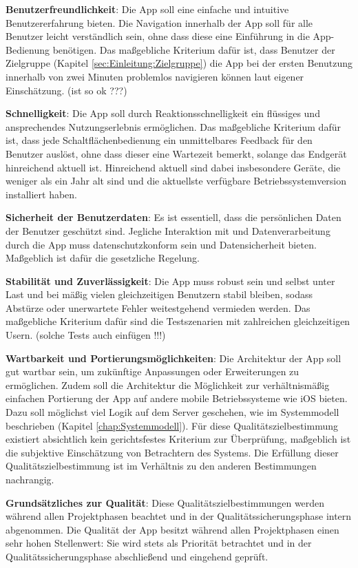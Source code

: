 \documentclass[oneside, ngerman]{sdqtechreport}
\begin{document}
\textbf{Benutzerfreundlichkeit}: Die App soll eine einfache und intuitive Benutzererfahrung bieten. Die Navigation innerhalb der App soll für alle Benutzer leicht verständlich sein, ohne dass diese eine Einführung in die App-Bedienung benötigen. Das maßgebliche Kriterium dafür ist, dass Benutzer der Zielgruppe (Kapitel \ref{sec:Einleitung:Zielgruppe}) die App bei der ersten Benutzung innerhalb von zwei Minuten problemlos navigieren können laut eigener Einschätzung. (ist so ok ???)

\textbf{Schnelligkeit}: Die App soll durch Reaktionsschnelligkeit ein flüssiges und ansprechendes Nutzungserlebnis ermöglichen. Das maßgebliche Kriterium dafür ist, dass jede Schaltflächenbedienung ein unmittelbares Feedback für den Benutzer auslöst, ohne dass dieser eine Wartezeit bemerkt, solange das Endgerät hinreichend aktuell ist. Hinreichend aktuell sind dabei insbesondere Geräte, die weniger als ein Jahr alt sind und die aktuellste verfügbare Betriebssystemversion installiert haben.

\textbf{Sicherheit der Benutzerdaten}: Es ist essentiell, dass die persönlichen Daten der Benutzer geschützt sind. Jegliche Interaktion mit und Datenverarbeitung durch die App muss datenschutzkonform sein und Datensicherheit bieten. Maßgeblich ist dafür die gesetzliche Regelung.

\textbf{Stabilität und Zuverlässigkeit}: Die App muss robust sein und selbst unter Last und bei mäßig vielen gleichzeitigen Benutzern stabil bleiben, sodass Abstürze oder unerwartete Fehler weitestgehend vermieden werden. Das maßgebliche Kriterium dafür sind die Testszenarien mit zahlreichen gleichzeitigen Usern. (solche Tests auch einfügen !!!)

\textbf{Wartbarkeit und Portierungsmöglichkeiten}: Die Architektur der App soll gut wartbar sein, um zukünftige Anpassungen oder Erweiterungen zu ermöglichen. Zudem soll die Architektur die Möglichkeit zur verhältnismäßig einfachen Portierung der App auf andere mobile Betriebssysteme wie iOS bieten. Dazu soll möglichst viel Logik auf dem Server geschehen, wie im Systemmodell beschrieben (Kapitel \ref{chap:Systemmodell}). Für diese Qualitätszielbestimmung existiert absichtlich kein gerichtsfestes Kriterium zur Überprüfung, maßgeblich ist die subjektive Einschätzung von Betrachtern des Systems. Die Erfüllung dieser Qualitätszielbestimmung ist im Verhältnis zu den anderen Bestimmungen nachrangig.

\textbf{Grundsätzliches zur Qualität}: Diese Qualitätszielbestimmungen werden während allen Projektphasen beachtet und in der Qualitätssicherungsphase intern abgenommen. Die Qualität der App besitzt während allen Projektphasen einen sehr hohen Stellenwert: Sie wird stets als Priorität betrachtet und in der Qualitätssicherungsphase abschließend und eingehend geprüft.
\end{document}

